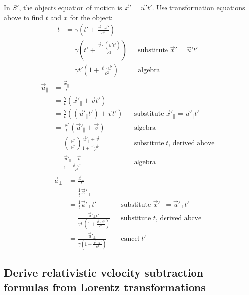 \documentclass[a4paper]{article}
\theoremstyle{plain}
\theoremstyle{definition}
\newcommand{\vect}[1]{\vec{#1}}
\begin{document}
In $S'$, the objects equation of motion is $\vect{x}' = \vect{u}' t'$.
Use transformation equations above to find $t$ and $x$ for the object:
\begin{align*}
t
  & = \gamma (t' + \frac{\vect{v} \cdot \vect{x}'}{c^2}) \\
  & = \gamma (t' + \frac{\vect{v} \cdot (\vect{u}' t')}{c^2}) & & \text{substitute $\vect{x}' = \vect{u}' t'$} \\
  & = \gamma t' (1 + \frac{\vect{v} \cdot \vect{u}'}{c^2}) & & \text{algebra}
\end{align*}
\begin{align*}
\vect{u}_{\parallel}
  & = \frac{\vect{x}_{\parallel}}{t} \\
  & = \frac{\gamma}{t} (\vect{x}'_{\parallel} + \vect{v}t') \\
  & = \frac{\gamma}{t} ((\vect{u}'_{\parallel} t') + \vect{v}t') & & \text{substitute $\vect{x}'_{\parallel} = \vect{u}'_{\parallel} t'$} \\
  & = \frac{\gamma t'}{t} (\vect{u}'_{\parallel} + \vect{v}) & & \text{algebra} \\
  & = \left( \frac{\gamma t'}{\gamma t'} \right) \frac{\vect{u}'_{\parallel} + \vect{v}}{1 + \frac{\vect{v} \cdot \vect{u}'}{c^2}} & & \text{substitute $t$, derived above} \\
  & = \frac{\vect{u}'_{\parallel} + \vect{v}}{1 + \frac{\vect{v} \cdot \vect{u}'}{c^2}} & & \text{algebra}
\end{align*}
\begin{align*}
\vect{u}_{\perp}
  & = \frac{\vect{x}_{\perp}}{t} \\
  & = \frac{1}{t} \vect{x}'_{\perp} \\
  & = \frac{1}{t} \vect{u}'_{\perp} t' & & \text{substitute $\vect{x}'_{\perp} = \vect{u}'_{\perp} t'$} \\
  & = \frac{\vect{u}'_{\perp} t'}{\gamma t' (1 + \frac{\vect{v} \cdot \vect{u}'}{c^2})} & & \text{substitute $t$, derived above} \\
  & = \frac{\vect{u}'_{\perp}}{\gamma (1 + \frac{\vect{v} \cdot \vect{u}'}{c^2})} & & \text{cancel $t'$}
\end{align*}


\subsection{Derive relativistic velocity subtraction formulas from Lorentz transformations}
\label{app:3d-derive-relativistic-velocity-subtraction-eqns}
\end{document}
